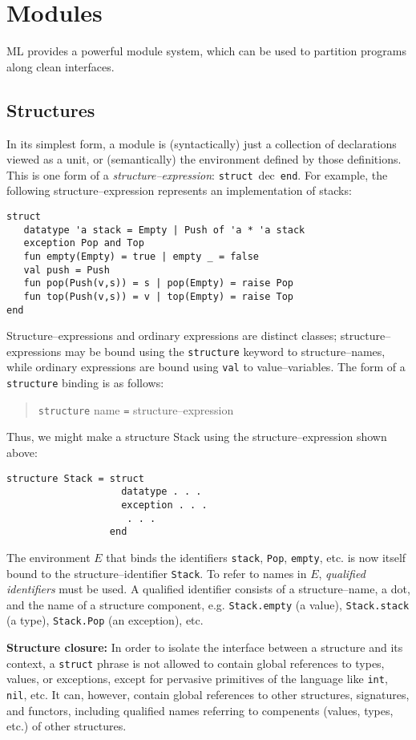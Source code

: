 \chapter{Modules}
ML provides a powerful module system, which can be used to partition
programs along clean interfaces.

\section{Structures}

In its simplest form, a module is
(syntactically) just a collection of declarations viewed as a unit,
or (semantically) the environment defined by those definitions.
This is one form  of a {\em structure--expression}:
\verb"struct"~dec~\verb"end".  For example, the following structure--expression represents an implementation of stacks:
\begin{verbatim}
struct
   datatype 'a stack = Empty | Push of 'a * 'a stack
   exception Pop and Top
   fun empty(Empty) = true | empty _ = false
   val push = Push
   fun pop(Push(v,s)) = s | pop(Empty) = raise Pop
   fun top(Push(v,s)) = v | top(Empty) = raise Top
end
\end{verbatim}
Structure--expressions and ordinary expressions are distinct classes;
structure--expressions may be bound using the \verb"structure"
keyword to structure--names, while ordinary expressions are
bound using \verb"val" to value--variables.
The form of a \verb"structure" binding is as follows:
\begin{quote}
\verb"structure" name \verb"=" structure--expression
\end{quote}
Thus, we might make a structure Stack using the structure--expression
shown above:
\begin{verbatim}
structure Stack = struct
                    datatype . . .
                    exception . . .
                     . . .
                  end
\end{verbatim}

The environment $E$ that binds the identifiers \verb"stack",
\verb"Pop", \verb"empty", etc. is now itself bound to the
structure--identifier \verb"Stack".  To refer to names in $E$, {\em
qualified identifiers} must be used.  A qualified identifier consists
of a structure--name, a dot, and the name of a structure component,
e.g. \verb"Stack.empty" (a value), \verb"Stack.stack" (a type),
\verb"Stack.Pop" (an exception), etc.

{\bf Structure closure:}  In order to isolate the interface between a
structure and its context, a \verb"struct" phrase is not allowed to
contain global references to types, values, or exceptions, except for
pervasive primitives of the language like \verb"int", \verb"nil",
etc.  It can, however, contain global references to other structures,
signatures, and functors, including qualified names referring to
compenents (values, types, etc.) of other structures.

